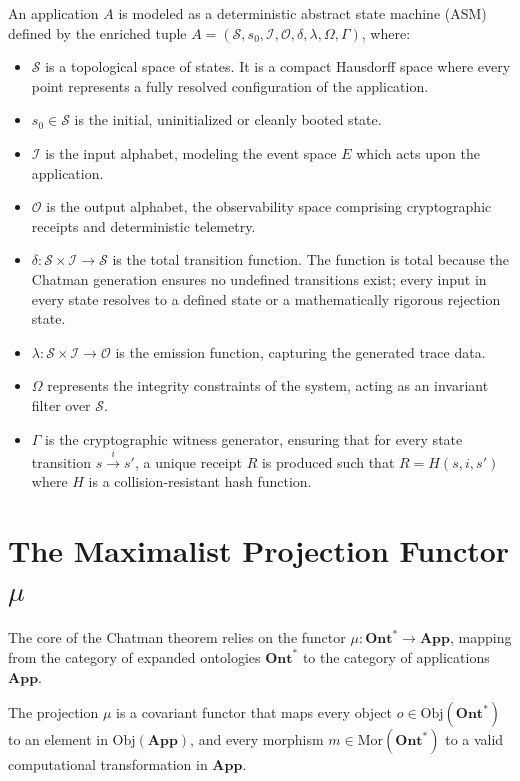 \begin{definition}[Application $A$]
An application $A$ is modeled as a deterministic abstract state machine (ASM) defined by the enriched tuple $A = (\mathcal{S}, s_0, \mathcal{I}, \mathcal{O}, \delta, \lambda, \Omega, \Gamma)$, where:
\begin{itemize}
    \item $\mathcal{S}$ is a topological space of states. It is a compact Hausdorff space where every point represents a fully resolved configuration of the application.
    \item $s_0 \in \mathcal{S}$ is the initial, uninitialized or cleanly booted state.
    \item $\mathcal{I}$ is the input alphabet, modeling the event space $E$ which acts upon the application.
    \item $\mathcal{O}$ is the output alphabet, the observability space comprising cryptographic receipts and deterministic telemetry.
    \item $\delta: \mathcal{S} \times \mathcal{I} \to \mathcal{S}$ is the total transition function. The function is total because the Chatman generation ensures no undefined transitions exist; every input in every state resolves to a defined state or a mathematically rigorous rejection state.
    \item $\lambda: \mathcal{S} \times \mathcal{I} \to \mathcal{O}$ is the emission function, capturing the generated trace data.
    \item $\Omega$ represents the integrity constraints of the system, acting as an invariant filter over $\mathcal{S}$.
    \item $\Gamma$ is the cryptographic witness generator, ensuring that for every state transition $s \xrightarrow{i} s'$, a unique receipt $R$ is produced such that $R = H(s, i, s')$ where $H$ is a collision-resistant hash function.
\end{itemize}
\end{definition}

\section{The Maximalist Projection Functor $\mu$}

The core of the Chatman theorem relies on the functor $\mu: \mathbf{Ont}^* \to \mathbf{App}$, mapping from the category of expanded ontologies $\mathbf{Ont}^*$ to the category of applications $\mathbf{App}$.

\begin{definition}
The projection $\mu$ is a covariant functor that maps every object $o \in \text{Obj}(\mathbf{Ont}^*)$ to an element in $\text{Obj}(\mathbf{App})$, and every morphism $m \in \text{Mor}(\mathbf{Ont}^*)$ to a valid computational transformation in $\mathbf{App}$.
\end{definition}

